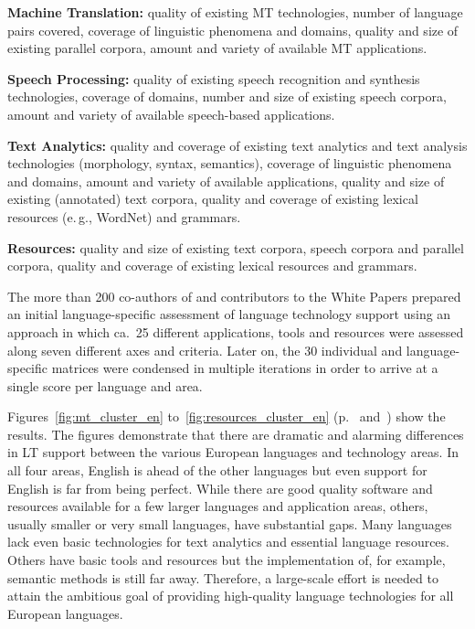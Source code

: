\documentclass[10pt, plain]{../../metanetpaper}
\begin{document}
\begin{multicols}{2}
\textbf{Machine Translation:} quality of existing MT technologies, number of language pairs covered, coverage of linguistic phenomena and domains, quality and size of existing parallel corpora, amount and variety of available MT applications.

\textbf{Speech Processing:} quality of existing speech recognition and synthesis technologies, coverage of domains, number and size of existing speech corpora, amount and variety of available speech-based applications.

\textbf{Text Analytics:} quality and coverage of existing text analytics and text analysis technologies (morphology, syntax, semantics), coverage of linguistic phenomena and domains, amount and variety of available applications, quality and size of existing (annotated) text corpora, quality and coverage of existing lexical resources (e.\,g., WordNet) and grammars.

\textbf{Resources:} quality and size of existing text corpora, speech corpora and parallel corpora, quality and coverage of existing lexical resources and grammars.

The more than 200 co-authors of and contributors to the White Papers prepared an initial language-specific assessment of language technology support using an approach in which ca.~25 different applications, tools and resources were assessed along seven different axes and criteria. Later on, the 30 individual and language-specific matrices were condensed in multiple iterations in order to arrive at a single score per language and area. 

Figures~\ref{fig:mt_cluster_en} to~\ref{fig:resources_cluster_en} (p.~\pageref{fig:mt_cluster_en} and~\pageref{fig:resources_cluster_en}) show the results. The figures demonstrate that there are dramatic and alarming differences in LT support between the various European languages and technology areas. In all four areas, English is ahead of the other languages but even support for English is far from being perfect. While there are good quality software and resources available for a few larger languages and application areas, others, usually smaller or very small languages, have substantial gaps. Many languages lack even basic technologies for text analytics and essential language resources. Others have basic tools and resources but the implementation of, for example, semantic methods is still far away. Therefore, a large-scale effort is needed to attain the ambitious goal of providing high-quality language technologies for all European languages.


\end{multicols}
\end{document}
